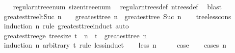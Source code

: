 \begin{isabellebody}
%
\isadelimproof
\ \ %
\endisadelimproof
%
\isatagproof
{}\isamarkupfalse%
\ regular{\isacharunderscore}{\kern0pt}n{\isacharunderscore}{\kern0pt}tree{\isacharunderscore}{\kern0pt}enum\ size{\isacharunderscore}{\kern0pt}n{\isacharunderscore}{\kern0pt}tree{\isacharunderscore}{\kern0pt}enum\ \isamarkupfalse%
\ regular{\isacharunderscore}{\kern0pt}n{\isacharunderscore}{\kern0pt}trees{\isacharunderscore}{\kern0pt}def\ n{\isacharunderscore}{\kern0pt}trees{\isacharunderscore}{\kern0pt}def\ \isamarkupfalse%
\ blast%
\endisatagproof
{\isafoldproof}%
%
\isadelimproof
\isanewline
%
\endisadelimproof
\isanewline
{}\isamarkupfalse%
\ greatest{\isacharunderscore}{\kern0pt}tree{\isacharunderscore}{\kern0pt}lt{\isacharunderscore}{\kern0pt}Suc{\isacharcolon}{\kern0pt}\ {\isachardoublequoteopen}n\ {\isasymnoteq}\ {}\ {\isasymLongrightarrow}\ greatest{\isacharunderscore}{\kern0pt}tree\ n\ {\isacharless}{\kern0pt}\ greatest{\isacharunderscore}{\kern0pt}tree\ {\isacharparenleft}{\kern0pt}Suc\ n{\isacharparenright}{\kern0pt}{\isachardoublequoteclose}\isanewline
%
\isadelimproof
\ \ %
\endisadelimproof
%
\isatagproof
{}\isamarkupfalse%
\ tree{\isacharunderscore}{\kern0pt}less{\isacharunderscore}{\kern0pt}cons{}\ \isamarkupfalse%
\ {\isacharparenleft}{\kern0pt}induction\ n\ rule{\isacharcolon}{\kern0pt}\ greatest{\isacharunderscore}{\kern0pt}tree{\isachardot}{\kern0pt}induct{\isacharparenright}{\kern0pt}\ auto%
\endisatagproof
{\isafoldproof}%
%
\isadelimproof
\isanewline
%
\endisadelimproof
\isanewline
{}\isamarkupfalse%
\ greatest{\isacharunderscore}{\kern0pt}tree{\isacharunderscore}{\kern0pt}ge{\isacharcolon}{\kern0pt}\ {\isachardoublequoteopen}tree{\isacharunderscore}{\kern0pt}size\ t\ {\isasymle}\ n\ {\isasymLongrightarrow}\ t\ {\isasymle}\ greatest{\isacharunderscore}{\kern0pt}tree\ n{\isachardoublequoteclose}\isanewline
%
\isadelimproof
%
\endisadelimproof
%
\isatagproof
{}\isamarkupfalse%
\ {\isacharparenleft}{\kern0pt}induction\ n\ arbitrary{\isacharcolon}{\kern0pt}\ t\ rule{\isacharcolon}{\kern0pt}\ less{\isacharunderscore}{\kern0pt}induct{\isacharparenright}{\kern0pt}\isanewline
\ \ \isamarkupfalse%
\ {\isacharparenleft}{\kern0pt}less\ n{\isacharparenright}{\kern0pt}\isanewline
\ \ \isamarkupfalse%
\ \isamarkupfalse%
\ {\isacharquery}{\kern0pt}case\isanewline
\ \ \isamarkupfalse%
\ {\isacharparenleft}{\kern0pt}cases\ n{\isacharparenright}{\kern0pt}\isanewline

\end{isabellebody}
